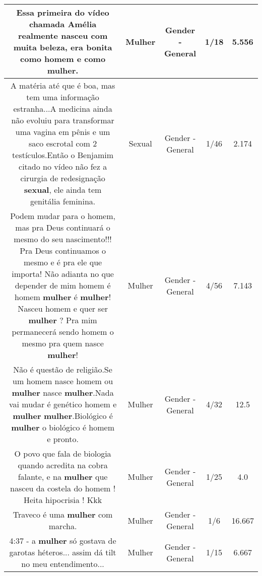 \documentclass[11pt]{article}
\newlength\mylength
\begin{document}
\begin{center}
\begin{longtable}{|C{.65\mylength}|C{.30\mylength}|C{.12\mylength}|C{.12\mylength}|C{.12\mylength}|}
  \small Essa primeira do vídeo chamada Amélia realmente nasceu com muita beleza, era bonita como homem e como \textbf{mulher}.\normalsize   & Mulher & Gender - General & 1/18 & 5.556 \\  \hline
  \small A matéria até que é boa, mas tem uma informação estranha...A medicina ainda não evoluiu para transformar uma vagina em pênis e um saco escrotal com 2 testículos.Então o Benjamim citado no vídeo não fez a cirurgia de redesignação \textbf{sexual}, ele ainda tem genitália feminina.\normalsize   & Sexual & Gender - General & 1/46 & 2.174 \\  \hline
  \small Podem mudar para o homem, mas pra Deus continuará o mesmo do seu nascimento!!! Pra Deus continuamos o mesmo e é pra ele que importa! Não adianta no que depender de mim homem é homem \textbf{mulher} é \textbf{mulher}! Nasceu homem e quer ser \textbf{mulher} ? Pra mim permanecerá sendo homem o mesmo pra quem nasce \textbf{mulher}!\normalsize   & Mulher & Gender - General & 4/56 & 7.143 \\  \hline
  \small Não é questão de religião.Se um homem nasce homem ou \textbf{mulher} nasce \textbf{mulher}.Nada vai mudar é genético homem e \textbf{mulher} \textbf{mulher}.Biológico é \textbf{mulher} o biológico é homem e pronto.\normalsize   & Mulher & Gender - General & 4/32 & 12.5 \\  \hline
  \small O povo que fala de biologia quando acredita na cobra falante, e na \textbf{mulher} que nasceu da costela do homem ! Heita hipocrisia ! Kkk\normalsize   & Mulher & Gender - General & 1/25 & 4.0 \\  \hline
  \small Traveco é uma \textbf{mulher} com marcha.\normalsize   & Mulher & Gender - General & 1/6 & 16.667 \\  \hline
  \small 4:37 - a \textbf{mulher} só gostava de garotas héteros... assim dá tilt no meu entendimento...\normalsize   & Mulher & Gender - General & 1/15 & 6.667 \\  \hline

\end{longtable}
\end{center}
\end{document}

